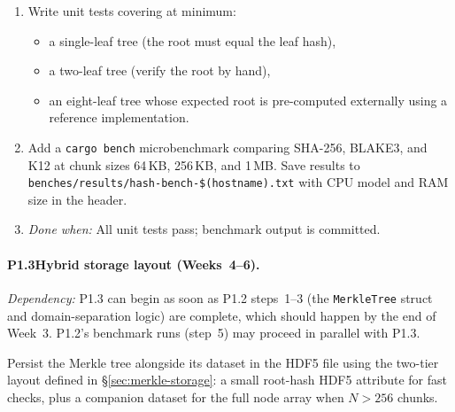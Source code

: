 \documentclass[11pt]{article}
\begin{document}
\begin{enumerate}[nosep]
  \item Write unit tests covering at minimum:
    \begin{itemize}[nosep]
      \item a single-leaf tree (the root must equal the leaf hash),
      \item a two-leaf tree (verify the root by hand),
      \item an eight-leaf tree whose expected root is pre-computed externally
        using a reference implementation.
    \end{itemize}
  \item Add a \texttt{cargo bench} microbenchmark comparing SHA-256, BLAKE3,
    and K12 at chunk sizes 64\,KB, 256\,KB, and 1\,MB. Save results to
    \texttt{benches/results/hash-bench-\$(hostname).txt} with CPU model and
    RAM size in the header.
  \item \emph{Done when:} All unit tests pass; benchmark output is committed.
\end{enumerate}

\paragraph{P1.3\enspace Hybrid storage layout (Weeks~4--6).}
\textit{Dependency:} P1.3 can begin as soon as P1.2 steps~1--3 (the
\texttt{MerkleTree} struct and domain-separation logic) are complete, which
should happen by the end of Week~3. P1.2's benchmark runs (step~5) may proceed
in parallel with P1.3.

Persist the Merkle tree alongside its dataset in the HDF5 file using the
two-tier layout defined in \S\ref{sec:merkle-storage}: a small root-hash
HDF5 attribute for fast checks, plus a companion dataset for the full node
array when $N > 256$ chunks.
\end{document}
